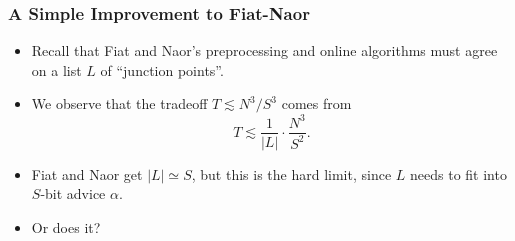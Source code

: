 \documentclass[usenames, dvipsnames, t, table]{beamer}
\begin{document}
    \begin{frame}
    \frametitle{A Simple Improvement to Fiat-Naor}
    \begin{itemize}
      \item Recall that Fiat and Naor's preprocessing and online algorithms must agree on a list $L$ of ``junction points''.
         \pause
       \item We observe that the tradeoff $T \lesssim N^3 / S^3$ comes from
         \[T \lesssim \frac{1}{|L|} \cdot \frac{N^3}{S^2}.\] \mypause
       \item Fiat and Naor get $|L|\simeq S$, but this is the hard limit, since $L$ needs to fit into $S$-bit advice $\alpha$.
         \item Or does it?
    \end{itemize}
  \end{frame}
\end{document}
